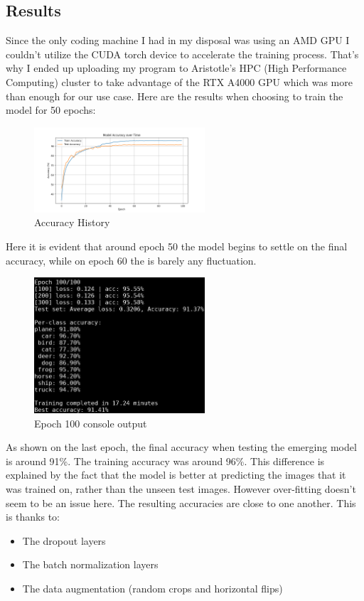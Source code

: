 \subsection{Results}
Since the only coding machine I had in my disposal was using an AMD GPU I couldn't utilize the
CUDA torch device to accelerate the training process. That's why I ended up uploading my program
to Aristotle's HPC (High Performance Computing) cluster to take advantage of the RTX A4000 GPU 
which was more than enough for our use case. Here are the results when choosing to train the model
for 50 epochs:
\begin{figure}[H]
    \centering
    \includegraphics[width=2.5in]{media/cifar10_accuracy.png}
    \caption{Accuracy History}
    \label{CIFAR example}
\end{figure}
Here it is evident that around epoch 50 the model begins to settle on the final accuracy, while on
epoch 60 the is barely any fluctuation.
\begin{figure}[H]
    \centering
    \includegraphics[width=2.5in]{media/epoch_100.png}
    \caption{Epoch 100 console output}
    \label{CIFAR example}
\end{figure}
As shown on the last epoch, the final accuracy when testing the emerging model is around 91\%. The 
training accuracy was around 96\%. This difference is explained by the fact that the model is better
at predicting the images that it was trained on, rather than the unseen test images. However over-fitting
doesn't seem to be an issue here. The resulting accuracies are close to one another. This is thanks to:
\begin{itemize}
    \item The dropout layers
    \item The batch normalization layers
    \item The data augmentation (random crops and horizontal flips) 
\end{itemize}

